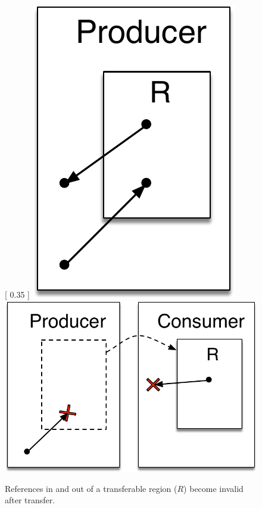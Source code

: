 \begin{figure}
\centering
{} [
  0.35\columnwidth
] {
  \includegraphics[scale=0.36]{producer-heap}
}
 {
  \includegraphics[scale=0.36]{producer-consumer-heap}
}

\caption{References in and out of a transferable region ($R$) become
invalid after transfer.}
\label{fig:transfer-violations}
\end{figure}

